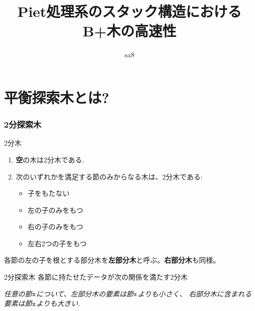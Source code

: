 \documentclass[10pt]{beamer}
\title{Piet処理系のスタック構造における\\B+木の高速性}
\author{sa8}
\begin{document}
\maketitle
\section{平衡探索木とは?}
\begin{frame}
    \frametitle{2分探索木}
    \begin{block}{2分木}
        \begin{enumerate}
            \item \textbf{空}の木は2分木である.
            \item 次のいずれかを満足する節のみからなる木は、2分木である:
                  \begin{itemize}
                      \item 子をもたない
                      \item 左の子のみをもつ
                      \item 右の子のみをもつ
                      \item 左右2つの子をもつ
                  \end{itemize}
        \end{enumerate}
    \end{block}
    各節の左の子を根とする部分木を{\bf 左部分木}と呼ぶ。{\bf 右部分木}も同様。
    \begin{block}{2分探索木}
        各節に持たせたデータが次の関係を満たす2分木

        \textsl{任意の節$\tt x$について、左部分木の要素は節$\tt x$よりも小さく、
            右部分木に含まれる要素は節$\tt x$よりも大きい.}
    \end{block}
\end{frame}
\end{document}
